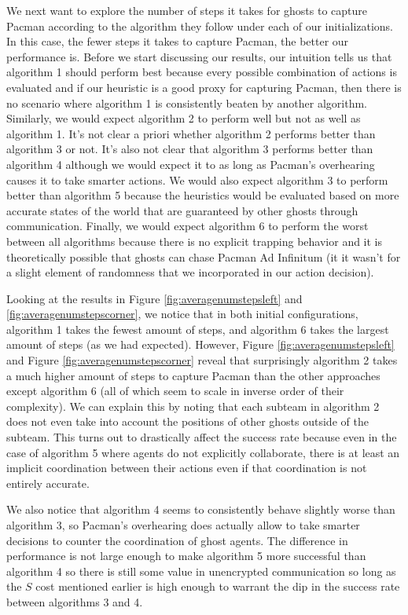 \documentclass[11pt]{article}
\begin{document}
\begin{multicols}{2}
\noindent We next want to explore the number of steps it takes for ghosts to capture Pacman according to the algorithm they follow under each of our initializations. In this case, the fewer steps it takes to capture Pacman, the better our performance is. Before we start discussing our results, our intuition tells us that algorithm 1 should perform best because every possible combination of actions is evaluated and if our heuristic is a good proxy for capturing Pacman, then there is no scenario where algorithm 1 is consistently beaten by another algorithm. Similarly, we would expect algorithm 2 to perform well but not as well as algorithm 1. It's not clear a priori whether algorithm 2 performs better than algorithm 3 or not. It's also not clear that algorithm 3 performs better than algorithm 4 although we would expect it to as long as Pacman's overhearing causes it to take smarter actions. We would also expect algorithm 3 to perform better than algorithm 5 because the heuristics would be evaluated based on more accurate states of the world that are guaranteed by other ghosts through communication. Finally, we would expect algorithm 6 to perform the worst between all algorithms because there is no explicit trapping behavior and it is theoretically possible that ghosts can chase Pacman Ad Infinitum (it it wasn't for a slight element of randomness that we incorporated in our action decision). 

Looking at the results in Figure \ref{fig:averagenumstepsleft} and  \ref{fig:averagenumstepscorner}, we notice that in both initial configurations, algorithm 1 takes the fewest amount of steps, and algorithm 6 takes the largest amount of steps (as we had expected). However, Figure \ref{fig:averagenumstepsleft} and Figure \ref{fig:averagenumstepscorner} reveal that surprisingly algorithm 2 takes a much higher amount of steps to capture Pacman than the other approaches except algorithm 6 (all of which seem to scale in inverse order of their complexity). We can explain this by noting that each subteam in algorithm 2 does not even take into account the positions of other ghosts outside of the subteam. This turns out to drastically affect the success rate because even in the case of algorithm 5 where agents do not explicitly collaborate, there is at least an implicit coordination between their actions even if that coordination is not entirely accurate.

We also notice that algorithm 4 seems to consistently behave slightly worse than algorithm 3, so Pacman's overhearing does actually allow to take smarter decisions to counter the coordination of ghost agents. The difference in performance is not large enough to make algorithm 5 more successful than algorithm 4 so there is still some value in unencrypted communication so long as the $S$ cost mentioned earlier is high enough to warrant the dip in the success rate between algorithms 3 and 4.


\end{multicols}
\end{document}
